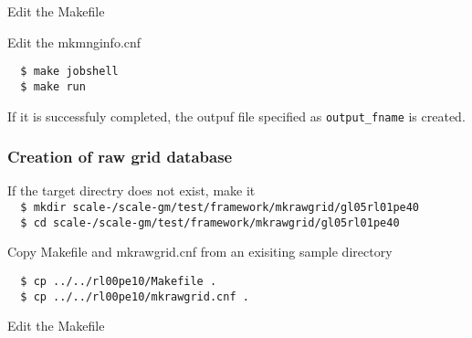 Edit the Makefile

Edit the mkmnginfo.cnf

\vspace{-4mm}
\begin{verbatim}
  $ make jobshell
  $ make run
\end{verbatim}
If it is successfuly completed, the outpuf file specified as {\verb|output_fname|} is created.


\subsubsection{Creation of raw grid database}
If the target directry does not exist, make it \\

\verb|  $ mkdir scale-|{\version}\verb|/scale-gm/test/framework/mkrawgrid/gl05rl01pe40| \\

\verb|  $ cd scale-|{\version}\verb|/scale-gm/test/framework/mkrawgrid/gl05rl01pe40|

Copy Makefile and mkrawgrid.cnf from an exisiting sample directory \\

\begin{verbatim}
  $ cp ../../rl00pe10/Makefile .
  $ cp ../../rl00pe10/mkrawgrid.cnf .
\end{verbatim}

Edit the Makefile

